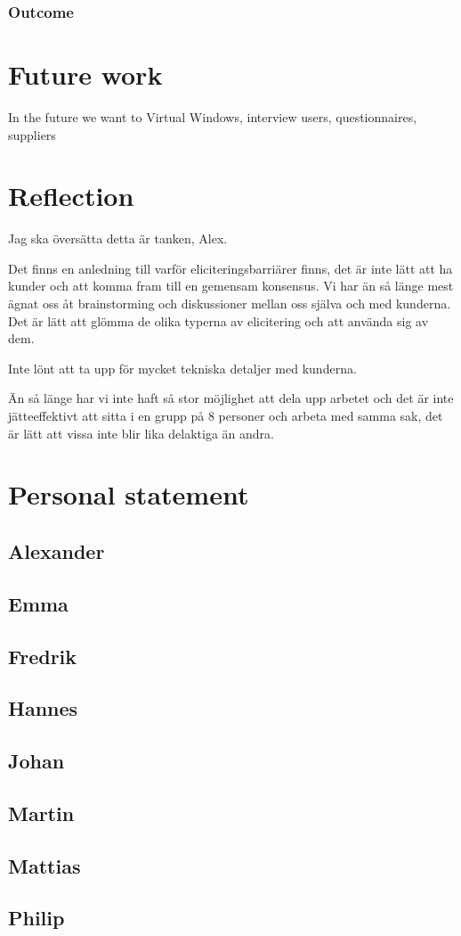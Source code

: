 \documentclass[a4paper]{article}
\begin{document}
    \subsubsection{Outcome}

  \section{Future work}

  In the future we want to 
  Virtual Windows, interview users, questionnaires, suppliers
  
  \section{Reflection}

  Jag ska översätta detta är tanken, Alex.

  Det finns en anledning till varför eliciteringsbarriärer finns, det är inte lätt att ha kunder och att komma fram till en gemensam konsensus.
  Vi har än så länge mest ägnat oss åt brainstorming och diskussioner mellan oss själva och med kunderna. Det är lätt att glömma de olika typerna av elicitering och att använda sig av dem. 
  
  Inte lönt att ta upp för mycket tekniska detaljer med kunderna.

	Än så länge har vi inte haft så stor möjlighet att dela upp arbetet och det är inte jätteeffektivt att sitta i en grupp på 8 personer och arbeta med samma sak, det är lätt att vissa inte blir lika delaktiga än andra. 


  \section{Personal statement}
  
  \subsection{Alexander}
  \subsection{Emma}
  \subsection{Fredrik}
  \subsection{Hannes}
  \subsection{Johan}
  \subsection{Martin}
  \subsection{Mattias}
  \subsection{Philip}
\end{document}
